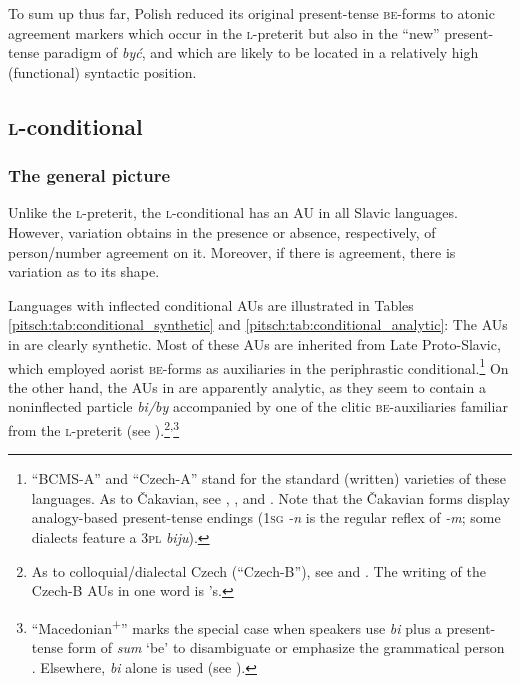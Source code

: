 \documentclass[output=paper]{langscibook}
\begin{document}
To sum up thus far, Polish reduced its original present-tense \textsc{be}-forms to atonic agreement markers which occur in the \textsc{l-}preterit but also in the ``new'' present-tense paradigm of \textit{być}, and which are likely to be located in a relatively high (functional) syntactic position.


\subsection{\textsc{l-}conditional}\label{pitsch:sec:conditional}

\subsubsection{The general picture}\largerpage[-1]

Unlike the \textsc{l-}preterit, the \textsc{l-}conditional has an AU in all Slavic languages. However, variation obtains in the presence or absence, respectively, of person/number agreement on it. Moreover, if there is agreement, there is variation as to its shape.

Languages with inflected conditional AUs are illustrated in Tables \ref{pitsch:tab:conditional_synthetic} and \ref{pitsch:tab:conditional_analytic}: The AUs in  are clearly synthetic. Most of these AUs are inherited from Late Proto-Slavic, which employed aorist \textsc{be}-forms as auxiliaries in the periphrastic conditional.\footnote{``BCMS-A'' and ``Czech-A'' stand for the standard (written) varieties of these languages. As to Čakavian, see \citet[35]{Panzer1967}, \citet[248--249]{Nehring2002}, and \citet[17--27]{Lisac2009}. Note that the Čakavian forms display analogy-based present-tense endings (\textsc{1sg} \textit{-n} is the regular reflex of \textit{-m}; some dialects feature a \textsc{3pl} \textit{biju}).} On the other hand, the AUs in  are apparently analytic, as they seem to contain a noninflected particle \textit{bi/by} accompanied by one of the clitic \textsc{be}-auxiliaries familiar from the \textsc{l-}preterit (see ).\footnote{As to colloquial/dialectal Czech (``Czech-B''), see \citet[310]{Toman1980} and \citet[92]{FranksKing2000}. The writing of the Czech-B AUs in one word is \citeauthor{Toman1980}'s.}\textsuperscript{,}\footnote{\label{fn:Macedonian}``Macedonian\textsuperscript{+}'' marks the special case when speakers use \textit{bi} plus a present-tense form of \textit{sum} `be' to disambiguate or emphasize the grammatical person \citep[see][110--111]{Kramer1986}. Elsewhere, \textit{bi} alone is used (see ).}
\end{document}
